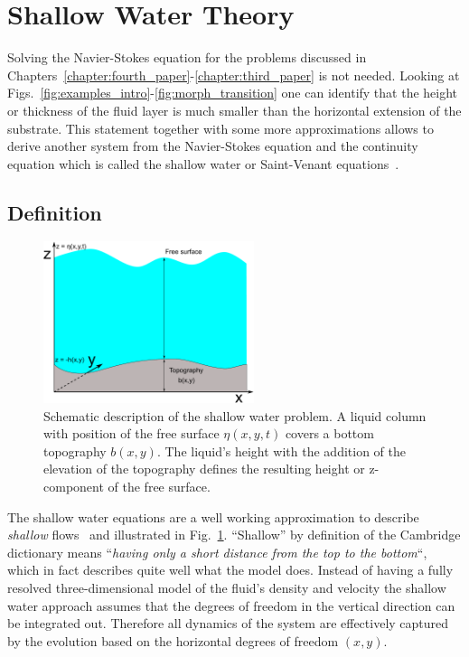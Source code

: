 \section{Shallow Water Theory}
\label{sec:theory_shallow_water}
Solving the Navier-Stokes equation for the problems discussed in Chapters~\ref{chapter:fourth_paper}-\ref{chapter:third_paper} is not needed.
Looking at Figs.~\ref{fig:examples_intro}-\ref{fig:morph_transition} one can identify that the height or thickness of the fluid layer is much smaller than the horizontal extension of the substrate.
This statement together with some more approximations allows to derive another system from the Navier-Stokes equation and the continuity equation which is called the shallow water or Saint-Venant equations~\cite{bTheorieMouvementNonpermanent1871}.

\subsection{Definition}
\begin{figure}
    \centering
    \includegraphics[width=0.55\textwidth]{graphics/simple_shallow_water.pdf}
    \caption{Schematic description of the shallow water problem. A liquid column with position of the free surface $\eta(x,y,t)$ covers a bottom topography $b(x,y)$.
    The liquid's height with the addition of the elevation of the topography defines the resulting height or z-component of the free surface.}
    \label{fig:shallow_water_drawing}
\end{figure}

The shallow water equations are a well working approximation to describe \textit{shallow} flows~\cite{tanShallowWaterHydrodynamics1992} and illustrated in Fig.~\ref{fig:shallow_water_drawing}.
``Shallow'' by definition of the Cambridge dictionary means ``\textit{having only a short distance from the top to the bottom}``, which in fact describes quite well what the model does.
Instead of having a fully resolved three-dimensional model of the fluid's density and velocity the shallow water approach assumes that the degrees of freedom in the vertical direction can be integrated out. 
Therefore all dynamics of the system are effectively captured by the evolution based on the horizontal degrees of freedom $(x,y)$.

